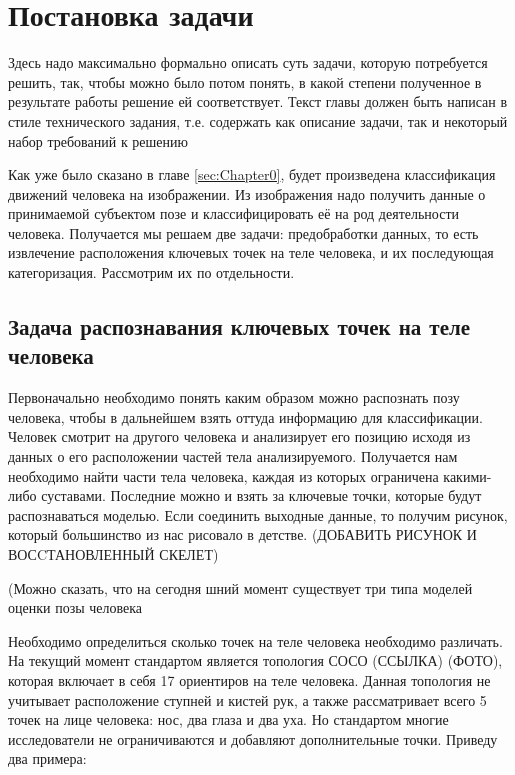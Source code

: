 \section{Постановка задачи}
\label{sec:Chapter1} 
Здесь надо максимально формально описать суть задачи, которую потребуется решить, так, чтобы можно было потом понять, в какой степени полученное в результате работы решение ей соответствует. Текст главы должен быть написан в стиле технического задания, т.е. содержать как описание задачи, так и некоторый набор требований к решению

Как уже было сказано в главе \ref{sec:Chapter0}, будет произведена классификация движений человека на изображении. Из изображения надо получить данные о принимаемой субъектом позе и классифицировать её на род деятельности человека. Получается мы решаем две задачи: предобработки данных, то есть извлечение расположения ключевых точек на теле человека, и их последующая категоризация. Рассмотрим их по отдельности.


\subsection{Задача распознавания ключевых точек на теле человека}

Первоначально необходимо понять каким образом можно распознать позу человека, чтобы в дальнейшем взять оттуда информацию для классификации. Человек смотрит на другого человека и анализирует его позицию исходя из данных о его расположении частей тела анализируемого. Получается нам необходимо найти части тела человека, каждая из которых ограничена какими-либо суставами. Последние можно и взять за ключевые точки, которые будут распознаваться моделью. Если соединить выходные данные, то получим рисунок, который большинство из нас рисовало в детстве. (ДОБАВИТЬ РИСУНОК И ВОСCТАНОВЛЕННЫЙ СКЕЛЕТ)

(Можно сказать, что на сегодня шний момент существует три типа моделей оценки позы человека

Необходимо определиться сколько точек на теле человека необходимо различать. На текущий момент стандартом является топология СОСО \label{COCO} (ССЫЛКА) (ФОТО), которая включает в себя 17 ориентиров на теле человека. Данная топология не учитывает расположение ступней и кистей рук, а также рассматривает всего 5 точек на лице человека: нос, два глаза и два уха. Но стандартом многие исследователи не ограничиваются и добавляют дополнительные точки. Приведу два примера:

